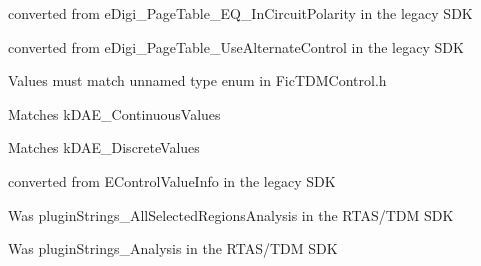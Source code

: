 \begin{DoxyRefList}
 converted from {\ttfamily e\+Digi\+\_\+\+Page\+Table\+\_\+\+EQ\+\_\+\+In\+Circuit\+Polarity} in the legacy SDK 
\item[Member \mbox{\hyperlink{a00503_aa169208a2ce713fa021e20deb2eaf608a1a0d975a333d3aee81b22f878697e9c4}{AAX\+\_\+e\+Page\+Table\+\_\+\+Use\+Alternate\+Control}} ]\label{a00802__porting_notes000026}%
%
 converted from {\ttfamily e\+Digi\+\_\+\+Page\+Table\+\_\+\+Use\+Alternate\+Control} in the legacy SDK 
\item[Member \mbox{\hyperlink{a00503_ace1a00189fa05277582cfb1e8ad48014}{AAX\+\_\+\+EParameter\+Type}} ]\label{a00802__porting_notes000010}%
%
 Values must match unnamed type enum in Fic\+TDMControl.\+h 
\item[Member \mbox{\hyperlink{a00503_a4cd0f189daa9a60cf36883c56344bb2eade82e7d1b5012a76837b70c1a9b92168}{AAX\+\_\+e\+Parameter\+Type\+\_\+\+Continuous}} ]\label{a00802__porting_notes000023}%
%
 Matches {\ttfamily k\+DAE\+\_\+\+Continuous\+Values}  
\item[Member \mbox{\hyperlink{a00503_a4cd0f189daa9a60cf36883c56344bb2ea2a3c9939ef1fa8b8f729152c35c42740}{AAX\+\_\+e\+Parameter\+Type\+\_\+\+Discrete}} ]\label{a00802__porting_notes000022}%
%
 Matches {\ttfamily k\+DAE\+\_\+\+Discrete\+Values}  
\item[Member \mbox{\hyperlink{a00503_aa169208a2ce713fa021e20deb2eaf608}{AAX\+\_\+\+EParameter\+Value\+Info\+Selector}} ]\label{a00802__porting_notes000011}%
%
 converted from {\ttfamily EControl\+Value\+Info} in the legacy SDK  
\item[Member \mbox{\hyperlink{a00503_a86f7310877399d9d4d2ea4863d472476a18ce96adcc5420f19c7247bde5718490}{AAX\+\_\+e\+Plug\+In\+Strings\+\_\+\+All\+Selected\+Regions\+Analysis}} ]\label{a00802__porting_notes000016}%
%
 Was plugin\+Strings\+\_\+\+All\+Selected\+Regions\+Analysis in the RTAS/\+TDM SDK  
\item[Member \mbox{\hyperlink{a00503_a86f7310877399d9d4d2ea4863d472476a452cb68d82f40ff3464752eed92543ed}{AAX\+\_\+e\+Plug\+In\+Strings\+\_\+\+Analysis}} ]\label{a00802__porting_notes000012}%
%
 Was plugin\+Strings\+\_\+\+Analysis in the RTAS/\+TDM SDK  
\item[Member \mbox{\hyperlink{a00503_a86f7310877399d9d4d2ea4863d472476a9b49eb0306daf949d9bf4a5d4b22ada0}{AAX\+\_\+e\+Plug\+In\+Strings\+\_\+\+Bypass}} ]\label{a00802__porting_notes000020}%

\end{DoxyRefList}
